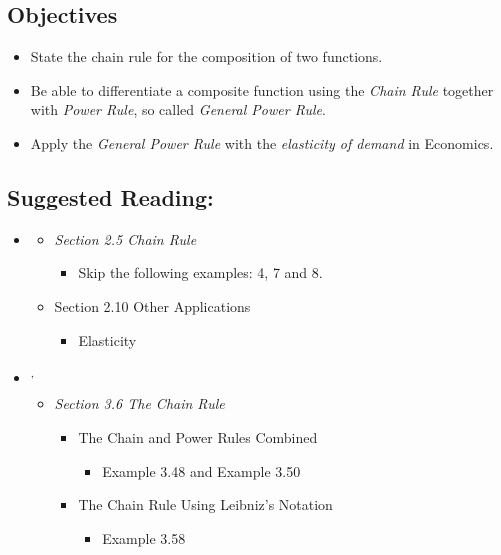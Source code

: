 \vspace{-0.25 in}
\begin{framed}
\subsection*{Objectives}
\begin{itemize}
    \item State the chain rule for the composition of two functions.
    \item Be able to differentiate a composite function using the \emph{Chain Rule} together with \emph{Power Rule}, so called \emph{General Power Rule}.
    \item Apply the \emph{General Power Rule} with the \emph{elasticity of demand} in Economics. 
\end{itemize}

\subsection*{Suggested Reading:}
\begin{itemize}
\item \cite{Calaway}\footnotemark[1]
   \begin{itemize}
        \item \emph{Section 2.5 Chain Rule}
        \begin{itemize}
            \item Skip the following examples: 4, 7 and 8.\footnotemark[2] 
        \end{itemize}
        \item Section 2.10 Other Applications
        \begin{itemize}
            \item Elasticity
        \end{itemize}
    \end{itemize}

\item \cite{openstax}\footnotemark[3]\textsuperscript{,}\footnotemark[4]
    \begin{itemize}
        \item \emph{Section 3.6 The Chain Rule}
        \begin{itemize}
            \item The Chain and Power Rules Combined
            \begin{itemize}
                \item Example 3.48 and Example 3.50
            \end{itemize}
            \item The Chain Rule Using Leibniz's Notation
            \begin{itemize}
                \item Example 3.58
            \end{itemize}
        \end{itemize}
    \end{itemize}
    

\end{itemize}
\end{framed}
